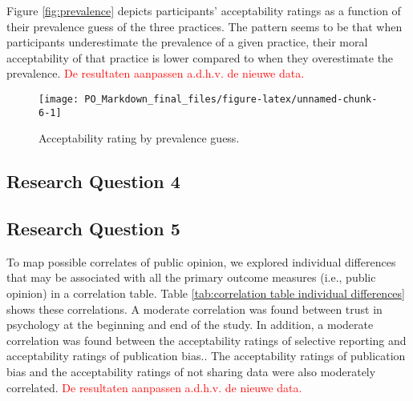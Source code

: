 \documentclass[
  man,floatsintext]{apa7}
\begin{document}
Figure \ref{fig:prevalence} depicts participants' acceptability ratings
as a function of their prevalence guess of the three practices. The
pattern seems to be that when participants underestimate the prevalence
of a given practice, their moral acceptability of that practice is lower
compared to when they overestimate the prevalence. \textcolor{red}{De resultaten aanpassen a.d.h.v. de nieuwe data.}

\begin{figure}
\texttt{[image: PO\_Markdown\_final\_files/figure-latex/unnamed-chunk-6-1]} \caption{Acceptability rating by prevalence guess.\label{fig:prevalence}}\label{fig:unnamed-chunk-6}
\end{figure}

\hypertarget{research-question-4}{%
\subsection{Research Question 4}\label{research-question-4}}

\hypertarget{research-question-5}{%
\subsection{Research Question 5}\label{research-question-5}}

To map possible correlates of public opinion, we explored individual differences that may be associated with all the primary outcome measures (i.e., public opinion) in a correlation table. Table \ref{tab:correlation table individual differences} shows these correlations. A moderate correlation was found between trust in psychology at the beginning and end of the study. In addition, a moderate correlation was found between the acceptability ratings of selective reporting and acceptability ratings of publication bias.. The acceptability ratings of publication bias and the acceptability ratings of not sharing data were also moderately correlated. \textcolor{red}{De resultaten aanpassen a.d.h.v. de nieuwe data.}
\end{document}
